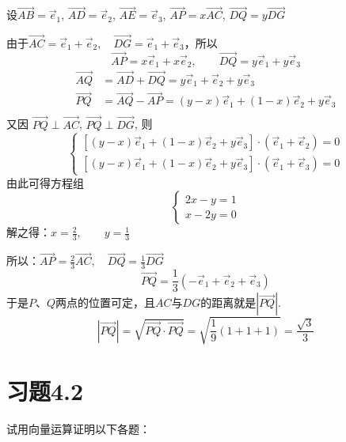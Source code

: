 \begin{solution}
设$\Vec{AB}=\vec{e}_1$, $\Vec{AD}=\vec{e}_2$, $\Vec{AE}=\vec{e}_3$, $\Vec{AP}=x\Vec{AC}$, $\Vec{DQ}=y\Vec{DG}$ 

由于$\Vec{AC}=\vec{e}_1+\vec{e}_2,\quad \Vec{DG}=\vec{e}_1+\vec{e}_3$，所以
\[\Vec{AP}=x\vec{e}_1+x\vec{e}_2,\qquad \Vec{DQ}=y\vec{e}_1+y\vec{e}_3\]
\[\begin{split}
    \Vec{AQ}&=\Vec{AD}+\Vec{DQ}=y\vec{e}_1+\vec{e}_2+y\vec{e}_3\\
    \Vec{PQ}&=\Vec{AQ}-\Vec{AP}=(y-x)\vec{e}_1+(1-x)\vec{e}_2+y\vec{e}_3\\
\end{split}\]
又因 $\Vec{P Q} \perp \Vec{A C}$, $\Vec{P Q} \perp \Vec{D G}$, 则
\[\begin{cases}
    {\left[(y-x) \vec{e}_{1}+(1-x) \vec{e}_{2}+y \vec{e}_{3}\right] \cdot\left(\vec{e}_{1}+\vec{e}_{2}\right)=0} \\
    {\left[(y-x) \vec{e}_{1}+(1-x) \vec{e}_{2}+y \vec{e}_{3}\right] \cdot\left(\vec{e}_{1}+\vec{e}_{3}\right)=0}
\end{cases}\]
由此可得方程组
\[\begin{cases}
    2 x-y=1 \\
x-2 y=0
\end{cases}\]
解之得：$x=\frac{2}{3}, \qquad y=\frac{1}{3}$

所以：$\Vec{AP}=\frac{2}{3}\Vec{AC},\quad \Vec{DQ}=\frac{1}{3}\Vec{DG}$
\[\Vec{PQ}=\frac{1}{3}\left(-\vec{e}_1+\vec{e}_2+\vec{e}_3\right)\]
于是$P$、$Q$两点的位置可定，且$AC$与$DG$的距离就是$|\Vec{PQ}|$. 
\[|\Vec{PQ}|=\sqrt{\Vec{PQ}\cdot \Vec{PQ}}=\sqrt{\frac{1}{9}(1+1+1)}=\frac{\sqrt{3}}{3}\]
\end{solution}


\section*{习题4.2}

试用向量运算证明以下各题：

